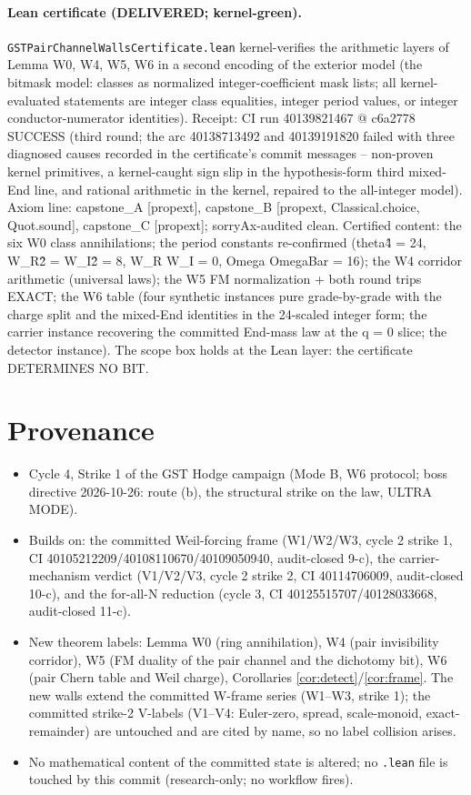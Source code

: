 \documentclass[11pt]{article}
\theoremstyle{definition}
\begin{document}
\paragraph{Lean certificate (DELIVERED; kernel-green).}
\texttt{GSTPairChannelWallsCertificate.lean} kernel-verifies the arithmetic
layers of Lemma W0, W4, W5, W6 in a second encoding of the exterior model
(the bitmask model: classes as normalized integer-coefficient mask lists;
all kernel-evaluated statements are integer class equalities, integer period
values, or integer conductor-numerator identities). Receipt: CI run
40139821467 @ c6a2778 SUCCESS (third round; the arc 40138713492 and
40139191820 failed with three diagnosed causes recorded in the certificate's
commit messages -- non-proven kernel primitives, a kernel-caught sign slip in
the hypothesis-form third mixed-End line, and rational arithmetic in the
kernel, repaired to the all-integer model). Axiom line: capstone\_A
[propext], capstone\_B [propext, Classical.choice, Quot.sound], capstone\_C
[propext]; sorryAx-audited clean. Certified content: the six W0 class
annihilations; the period constants re-confirmed (theta\^4 = 24, W\_R\^2 =
W\_I\^2 = 8, W\_R W\_I = 0, Omega OmegaBar = 16); the W4 corridor
arithmetic (universal laws); the W5 FM normalization + both round trips
EXACT; the W6 table (four synthetic instances pure grade-by-grade with the
charge split and the mixed-End identities in the 24-scaled integer form; the
carrier instance recovering the committed End-mass law at the q = 0 slice;
the detector instance). The scope box holds at the Lean layer: the
certificate DETERMINES NO BIT.

\section{Provenance}

\begin{itemize}
\item Cycle 4, Strike 1 of the GST Hodge campaign (Mode B, W6 protocol;
boss directive 2026-10-26: route (b), the structural strike on the law,
ULTRA MODE).
\item Builds on: the committed Weil-forcing frame (W1/W2/W3, cycle 2
strike 1, CI 40105212209/40108110670/40109050940, audit-closed 9-c), the
carrier-mechanism verdict (V1/V2/V3, cycle 2 strike 2, CI 40114706009,
audit-closed 10-c), and the for-all-N reduction (cycle 3, CI
40125515707/40128033668, audit-closed 11-c).
\item New theorem labels: Lemma W0 (ring annihilation), W4 (pair
invisibility corridor), W5 (FM duality of the pair channel and the
dichotomy bit), W6 (pair Chern table and Weil charge), Corollaries
\ref{cor:detect}/\ref{cor:frame}. The new walls extend the committed
W-frame series (W1--W3, strike 1); the committed strike-2 V-labels
(V1--V4: Euler-zero, spread, scale-monoid, exact-remainder) are untouched
and are cited by name, so no label collision arises.
\item No mathematical content of the committed state is altered; no
\texttt{.lean} file is touched by this commit (research-only; no workflow
fires).
\end{itemize}
\end{document}
